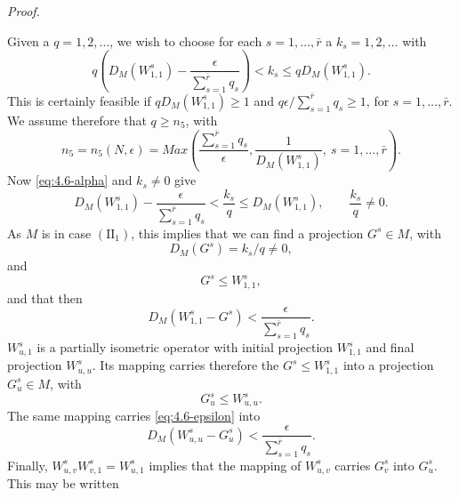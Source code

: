 \documentclass[b5paper,twoside]{article}
\theoremstyle{mvnplain}
\renewenvironment{proof}[1][Proof]{%
  \par\addvspace{0.35\baselineskip}%
  \noindent\textit{#1.}\ \normalfont\ignorespaces
}{%
  \par\addvspace{0.35\baselineskip}%
}
\newcommand{\M}{\mathbf M}
\newcommand{\N}{\mathbf N}
\def\M{M}%
\def\N{N}%
\def\operatorname#1{#1}%
\begin{document}
\begin{proof}
Given a \(q=1,2,\ldots\), we wish to choose for each
\(s=1,\ldots,\bar r\) a \(k_s=1,2,\ldots\) with
\begin{equation}\tag{4.6.\(\alpha\)}\label{eq:4.6-alpha}
 q\left(D_{\M}(W^s_{1,1})-\frac{\epsilon}{\sum_{s=1}^{\bar r}q_s}\right)
 <k_s\leq qD_{\M}(W^s_{1,1}).
\end{equation}
This is certainly feasible if \(qD_{\M}(W^s_{1,1})\geq1\) and
\(q\epsilon/\sum_{s=1}^{\bar r}q_s\geq1\), for
\(s=1,\ldots,\bar r\). We assume therefore that \(q\geq n_5\), with
\begin{equation}\tag{4.6.\(\beta\)}\label{eq:4.6-beta}
 n_5=n_5(\N,\epsilon)=
 \operatorname{Max}\left(\frac{\sum_{s=1}^{\bar r}q_s}{\epsilon},
 \frac{1}{D_{\M}(W^s_{1,1})},\ s=1,\ldots,\bar r\right).
\end{equation}
Now \eqref{eq:4.6-alpha} and \(k_s\ne0\) give
\[
 D_{\M}(W^s_{1,1})-\frac{\epsilon}{\sum_{s=1}^{\bar r}q_s}
 <\frac{k_s}{q}\leq D_{\M}(W^s_{1,1}),\qquad \frac{k_s}{q}\ne0.
\]
As \(\M\) is in case \((\mathrm{II}_1)\), this implies that we can find a
projection \(G^s\in\M\), with
\begin{equation}\tag{4.6.\(\gamma\)}\label{eq:4.6-gamma}
 D_{\M}(G^s)=k_s/q\ne0,
\end{equation}
and
\begin{equation}\tag{4.6.\(\delta\)}\label{eq:4.6-delta}
 G^s\leq W^s_{1,1},
\end{equation}
and that then
\begin{equation}\tag{4.6.\(\epsilon\)}\label{eq:4.6-epsilon}
 D_{\M}(W^s_{1,1}-G^s)<\frac{\epsilon}{\sum_{s=1}^{\bar r}q_s}.
\end{equation}
\(W^s_{u,1}\) is a partially isometric operator with initial projection
\(W^s_{1,1}\) and final projection \(W^s_{u,u}\). Its mapping carries
therefore the \(G^s\leq W^s_{1,1}\) into a projection \(G^s_u\in\M\), with
\begin{equation}\tag{4.6.\(\zeta\)}\label{eq:4.6-zeta}
 G^s_u\leq W^s_{u,u}.
\end{equation}
The same mapping carries \eqref{eq:4.6-epsilon} into
\begin{equation}\tag{4.6.\(\eta\)}\label{eq:4.6-eta}
 D_{\M}(W^s_{u,u}-G^s_u)<\frac{\epsilon}{\sum_{s=1}^{\bar r}q_s}.
\end{equation}
Finally, \(W^s_{u,v}W^s_{v,1}=W^s_{u,1}\) implies that the mapping of
\(W^s_{u,v}\) carries \(G^s_v\) into \(G^s_u\). This may be written
\begin{equation}\tag{4.6.\(\theta\)}\label{eq:4.6-theta}

\end{equation}
\end{proof}
\end{document}
